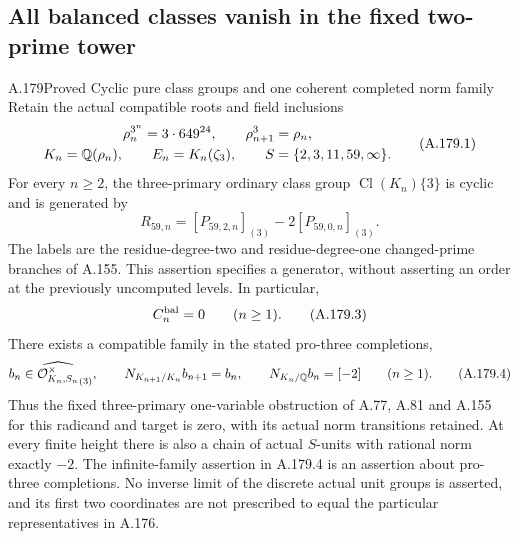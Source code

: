 \subsection{All balanced classes vanish in the fixed two-prime tower}

\begin{statement}{A.179}{Proved}
{Cyclic pure class groups and one coherent completed norm family}
Retain the actual compatible roots and field inclusions
\[
 \begin{gathered}
 \rho_n^{3^n}=3\cdot649^{24},\qquad
 \rho_{n+1}^3=\rho_n,\\
 K_n=\mathbb Q(\rho_n),\qquad E_n=K_n(\zeta_3),
 \qquad S=\{2,3,11,59,\infty\}.
 \end{gathered}
\tag{A.179.1}
\]
For every \(n\ge2\), the three-primary ordinary class group
\(\operatorname{Cl}(K_n)\{3\}\) is cyclic and is generated by
\[
 R_{59,n}=[P_{59,2,n}]_{(3)}-2[P_{59,0,n}]_{(3)}.
\tag{A.179.2}
\]
The labels are the residue-degree-two and residue-degree-one
changed-prime branches of A.155.  This assertion specifies a
generator, without asserting an order at the previously uncomputed
levels.  In particular,
\[
                         C_n^{\rm bal}=0
                         \qquad(n\ge1).
\tag{A.179.3}
\]
There exists a compatible family in the stated pro-three completions,
\[
 b_n\in\widehat{\mathcal O_{K_n,S_n}^{\times}}_{(3)},\qquad
 N_{K_{n+1}/K_n}b_{n+1}=b_n,\qquad
 N_{K_n/\mathbb Q}b_n=[-2]\qquad(n\ge1).
\tag{A.179.4}
\]
Thus the fixed three-primary one-variable obstruction of A.77,
A.81 and A.155 for this radicand and target is zero, with its actual
norm transitions retained.  At every finite height there is also
a chain of actual \(S\)-units with rational norm exactly \(-2\).
The infinite-family assertion in A.179.4 is an assertion about
pro-three completions.  No inverse limit of the discrete actual
unit groups is asserted, and its first two coordinates are not
prescribed to equal the particular representatives in A.176.
\end{statement}


